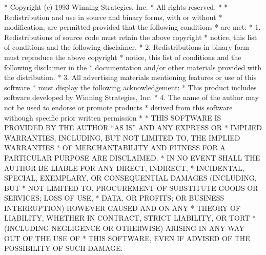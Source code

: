 \begin{copyrightEnv}
 * Copyright (c) 1993 Winning Strategies, Inc.
 * All rights reserved.
 *
 * Redistribution and use in source and binary forms, with or without
 * modification, are permitted provided that the following conditions
 * are met:
 * 1. Redistributions of source code must retain the above copyright
 *    notice, this list of conditions and the following disclaimer.
 * 2. Redistributions in binary form must reproduce the above copyright
 *    notice, this list of conditions and the following disclaimer in the
 *    documentation and/or other materials provided with the distribution.
 * 3. All advertising materials mentioning features or use of this software
 *    must display the following acknowledgement:
 *      This product includes software developed by Winning Strategies, Inc.
 * 4. The name of the author may not be used to endorse or promote products
 *    derived from this software withough specific prior written permission
 *
 * THIS SOFTWARE IS PROVIDED BY THE AUTHOR ``AS IS'' AND ANY EXPRESS OR
 * IMPLIED WARRANTIES, INCLUDING, BUT NOT LIMITED TO, THE IMPLIED WARRANTIES
 * OF MERCHANTABILITY AND FITNESS FOR A PARTICULAR PURPOSE ARE DISCLAIMED.
 * IN NO EVENT SHALL THE AUTHOR BE LIABLE FOR ANY DIRECT, INDIRECT,
 * INCIDENTAL, SPECIAL, EXEMPLARY, OR CONSEQUENTIAL DAMAGES (INCLUDING, BUT
 * NOT LIMITED TO, PROCUREMENT OF SUBSTITUTE GOODS OR SERVICES; LOSS OF USE,
 * DATA, OR PROFITS; OR BUSINESS INTERRUPTION) HOWEVER CAUSED AND ON ANY
 * THEORY OF LIABILITY, WHETHER IN CONTRACT, STRICT LIABILITY, OR TORT
 * (INCLUDING NEGLIGENCE OR OTHERWISE) ARISING IN ANY WAY OUT OF THE USE OF
 * THIS SOFTWARE, EVEN IF ADVISED OF THE POSSIBILITY OF SUCH DAMAGE.
\end{copyrightEnv}

